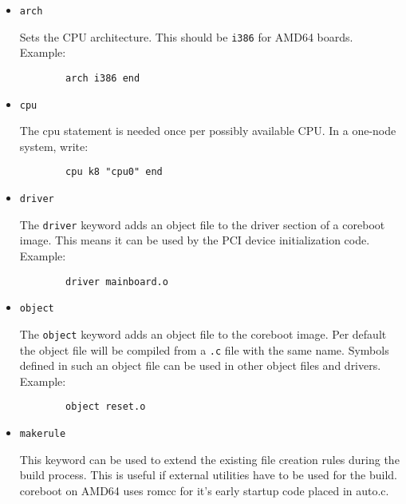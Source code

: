 \documentclass[titlepage,12pt]{article}
\begin{document}
\begin{itemize}
\item \begin{verbatim}arch\end{verbatim}

Sets the CPU architecture. This should be \texttt{i386} for AMD64 boards.\\
Example:

\begin{verbatim}
        arch i386 end
\end{verbatim}

\item \begin{verbatim}cpu\end{verbatim}

The cpu statement is needed once per possibly available CPU. In a
one-node system, write:

\begin{verbatim}
        cpu k8 "cpu0" end
\end{verbatim}

\item \begin{verbatim}driver\end{verbatim}

The \texttt{driver} keyword adds an object file to the driver section of a
coreboot image.  This means it can be used by the PCI device
initialization code. Example:

\begin{verbatim}
        driver mainboard.o
\end{verbatim}

\item \begin{verbatim}object\end{verbatim}

The \texttt{object} keyword adds an object file to the coreboot image.
Per default the object file will be compiled from a \texttt{.c} file
with the same name. Symbols defined in such an object file can be used
in other object files and drivers. Example:

\begin{verbatim}
        object reset.o
\end{verbatim}

\item \begin{verbatim}makerule\end{verbatim}

This keyword can be used to extend the existing file creation rules
during the build process. This is useful if external utilities have to
be used for the build. coreboot on AMD64 uses romcc for it's early
startup code placed in auto.c.


\end{itemize}
\end{document}
